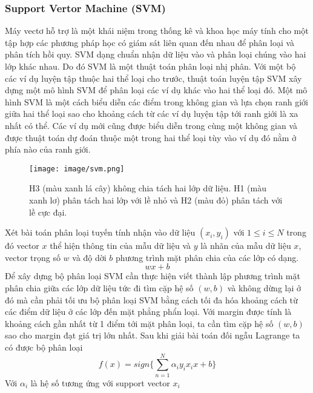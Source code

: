 \documentclass[12pt,a4paper]{article}
\begin{document}
            \subsubsection{Support Vertor Machine (SVM) \cite{SVM}}
 Máy vectơ hỗ trợ là một khái niệm trong thống kê và khoa học máy tính cho một tập hợp các phương pháp học có giám sát liên quan đến nhau để phân loại và phân tích hồi quy. SVM dạng chuẩn nhận dữ liệu vào và phân loại chúng vào hai lớp khác nhau. Do đó SVM là một thuật toán phân loại nhị phân. Với một bộ các ví dụ luyện tập thuộc hai thể loại cho trước, thuật toán luyện tập SVM xây dựng một mô hình SVM để phân loại các ví dụ khác vào hai thể loại đó. Một mô hình SVM là một cách biểu diễn các điểm trong không gian và lựa chọn ranh giới giữa hai thể loại sao cho khoảng cách từ các ví dụ luyện tập tới ranh giới là xa nhất có thể. Các ví dụ mới cũng được biểu diễn trong cùng một không gian và được thuật toán dự đoán thuộc một trong hai thể loại tùy vào ví dụ đó nằm ở phía nào của ranh giới.


                \begin{figure}[H]
                    \centering
                    \texttt{[image: image/svm.png]}
                    \caption{H3 (màu xanh lá cây) không chia tách hai lớp dữ liệu. H1 (màu xanh lơ) phân tách hai lớp với lề nhỏ và H2 (màu đỏ) phân tách với lề cực đại. \cite{SVM}}
                    \label{fig:my_label}
                \end{figure}
    Xét bài toán phân loại tuyến tính nhận vào dữ liệu $(x_i, y_i)$ với $1 \leq i \leq N$ trong đó vector $x$ thể hiện thông tin của mẫu dữ liệu và $y$ là nhãn của mẫu dữ liệu $x$, vector trọng số $w$ và độ dời $b$ phương trình mặt phân chia của các lớp có dạng.
    \begin{equation}
    wx + b
\end{equation}
Để xây dựng bộ phân loại SVM cần thực hiện viết thành lập phương trình mặt phân chia giữa các lớp dữ liệu tức đi tìm cặp hệ số $(w, b)$ và không dừng lại ở đó mà cần phải tối ưu bộ phân loại SVM bằng cách tối đa hóa khoảng cách từ các điểm dữ liệu ở các lớp đến mặt phẳng phẩn loại. Với margin được tính là khoảng cách gần nhất từ 1 điểm tới mặt phân loại, ta cần tìm cặp hệ số $(w, b)$ sao cho margin đạt giá trị lớn nhất. Sau khi giải bài toán đối ngẫu Lagrange ta có được bộ phân loại
\begin{equation}
f(x) = sign\{\sum_{n=1}^{N} \alpha_i y_i x_i x + b \}
\end{equation}
Với $\alpha_i$ là hệ số tương ứng với support vector $x_i$
\end{document}
